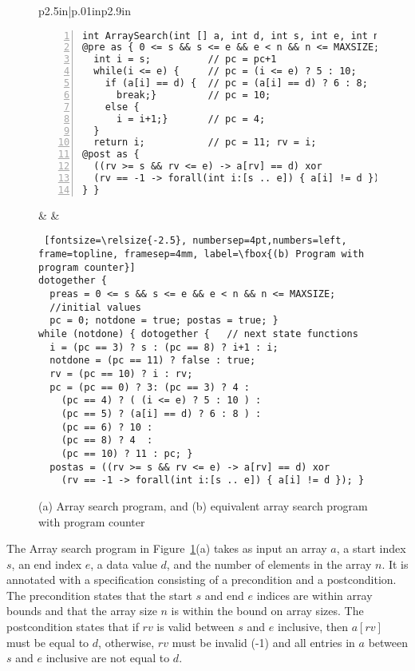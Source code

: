 \begin{figure}[tb]
  \centering
  \small {
  \begin{tabular}{p{2.5in}|p{.01in}p{2.9in}}
\begin{Verbatim}[fontsize=\relsize{-2.5}, numbersep=4pt,numbers=left,
frame=topline, framesep=4mm, label=\fbox{(a) Array search program}]
int ArraySearch(int [] a, int d, int s, int e, int n) {
@pre as { 0 <= s && s <= e && e < n && n <= MAXSIZE; }
  int i = s;          // pc = pc+1
  while(i <= e) {     // pc = (i <= e) ? 5 : 10;
    if (a[i] == d) {  // pc = (a[i] == d) ? 6 : 8;
      break;}         // pc = 10;
    else {
      i = i+1;}       // pc = 4;
  }
  return i;           // pc = 11; rv = i;
@post as {
  ((rv >= s && rv <= e) -> a[rv] == d) xor 
  (rv == -1 -> forall(int i:[s .. e]) { a[i] != d })
} }
\end{Verbatim}
& &
\begin{Verbatim} [fontsize=\relsize{-2.5}, numbersep=4pt,numbers=left,
frame=topline, framesep=4mm, label=\fbox{(b) Program with program counter}]
dotogether {
  preas = 0 <= s && s <= e && e < n && n <= MAXSIZE;
  //initial values
  pc = 0; notdone = true; postas = true; }
while (notdone) { dotogether {   // next state functions
  i = (pc == 3) ? s : (pc == 8) ? i+1 : i;
  notdone = (pc == 11) ? false : true;
  rv = (pc == 10) ? i : rv;
  pc = (pc == 0) ? 3: (pc == 3) ? 4 : 
    (pc == 4) ? ( (i <= e) ? 5 : 10 ) :
    (pc == 5) ? (a[i] == d) ? 6 : 8 ) :
    (pc == 6) ? 10 :
    (pc == 8) ? 4  : 
    (pc == 10) ? 11 : pc; }
  postas = ((rv >= s && rv <= e) -> a[rv] == d) xor
    (rv == -1 -> forall(int i:[s .. e]) { a[i] != d }); }
\end{Verbatim}
\end{tabular}
}
\caption{(a) Array search program, and (b) equivalent array search program with program
counter}
\label{f:arraysearch}
\end{figure}

The Array search program in Figure~\ref{f:arraysearch}(a) takes as input an array $a$, 
a start index $s$, an end index $e$, a data value $d$, and the number of 
elements in the array $n$.
It is annotated with a specification consisting of a precondition and a postcondition. 
The precondition states that the start $s$ and end $e$ indices are within array
bounds and that the array size $n$ is within the bound on array sizes. 
The postcondition states that if $rv$ is valid between $s$ and $e$ inclusive, 
then $a[rv]$ must be equal to $d$, 
otherwise, $rv$ must be invalid (-1) and all entries in $a$ between $s$ 
and $e$ inclusive are not equal to $d$. 

